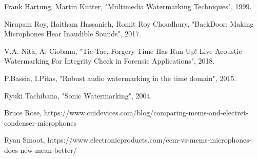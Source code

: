 
\begin{thebibliography}{9}

Frank Hartung, Martin Kutter, "Multimedia Watermarking Techniques", 1999.

Nirupam Roy, Haitham Hassanieh, Romit Roy Choudhury, "BackDoor: Making Microphones Hear Inaudible Sounds", 2017.

V.A. Niță, A. Ciobanu, "Tic-Tac, Forgery Time Has Run-Up! Live Acoustic Watermarking For Integrity Check in Forensic Applications", 2018.

P.Bassia, I.Pitas, "Robust audio watermarking in the time domain", 2015.

Ryuki Tachibana, "Sonic Watermarking", 2004.


Bruce Rose, https://www.cuidevices.com/blog/comparing-mems-and-electret-condenser-microphones

Ryan Smoot, https://www.electronicproducts.com/ecm-vs-mems-microphones-does-new-mean-better/

    
\end{thebibliography}